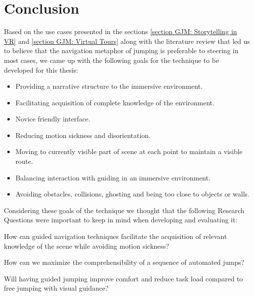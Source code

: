 
\section{Conclusion}
\label{section GJM: Conclusion}
Based on the use cases presented in the sections \ref{section GJM: Storytelling in VR} and \ref{section GJM: Virtual Tours} along with the literature review that led us to believe that the navigation metaphor of jumping is preferable to steering in most cases, we came up with the following goals for the technique to be developed for this thesis:
\begin{itemize}
	\item Providing a narrative structure to the immersive environment.
	\item Facilitating acquisition of complete knowledge of the environment.
	\item Novice friendly interface.
	\item Reducing motion sickness and disorientation.
	\item Moving to currently visible part of scene at each point to maintain a visible route.
	\item Balancing interaction with guiding in an immersive environment.
	\item Avoiding obstacles, collisions, ghosting and being too close to objects or walls.
\end{itemize}
Considering these goals of the technique we thought that the following Research Questions were important to keep in mind when developing and evaluating it: 
\begin{researchq}
	\label{rq:rq1}
	How can guided navigation techniques facilitate the acquisition of relevant knowledge of the scene while avoiding motion sickness?
\end{researchq}
\begin{researchq}
	\label{rq:rq2}
	How can we maximize the comprehensibility of a sequence of automated jumps?
\end{researchq}
\begin{researchq}
	\label{rq:rq3}
	Will having guided jumping improve comfort and reduce task load compared to free jumping with visual guidance?
\end{researchq}

